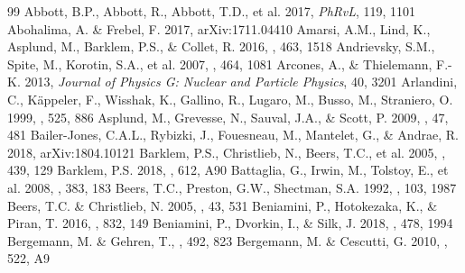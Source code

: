 \documentclass[preprint]{aastex61}
\begin{document}


\footnotesize{
\begin{thebibliography}{99}
 Abbott, B.P., Abbott, R.,
  Abbott, T.D., et al. 2017, {\it PhRvL}, 119, 1101
 Abohalima, A. \&
  Frebel, F. 2017, arXiv:1711.04410
 Amarsi, A.M., Lind, K.,
  Asplund, M., Barklem, P.S., \& Collet, R. 2016, \mnras, 463, 1518
 Andrievsky, S.M.,
  Spite, M., Korotin, S.A., et al. 2007, \aap, 464, 1081
  Arcones, A., \& Thielemann, F.-K. 2013, {\it Journal of Physics G:
    Nuclear and Particle Physics}, 40, 3201
 Arlandini, C.,
  K\"{a}ppeler, F., Wisshak, K., Gallino, R., Lugaro, M., Busso, M.,
  Straniero, O. 1999, \apj, 525, 886
 Asplund, M., Grevesse,
N., Sauval, J.A., \& Scott, P. 2009, \araa, 47, 481
 Bailer-Jones,
  C.A.L., Rybizki, J., Fouesneau, M., Mantelet, G., \& Andrae,
  R. 2018, arXiv:1804.10121
 Barklem, P.S.,
  Christlieb, N., Beers, T.C., et al. 2005, \aap, 439, 129
 Barklem, P.S. 2018, \aap, 612,
  A90
 Battaglia, G., Irwin,
  M., Tolstoy, E., et al. 2008, \mnras, 383, 183
 Beers, T.C., Preston, G.W.,
  Shectman, S.A. 1992, \aj, 103, 1987
 Beers,
  T.C. \& Christlieb, N. 2005, \araa, 43, 531
 Beniamini, P.,
  Hotokezaka, K., \& Piran, T. 2016, \apj, 832, 149
 Beniamini, P.,
  Dvorkin, I., \& Silk, J. 2018, \mnras, 478, 1994
 Bergemann,
  M. \& Gehren, T., \aap, 492, 823
  Bergemann, M. \& Cescutti, G. 2010, \aap, 522, A9

\end{thebibliography}}
\end{document}
